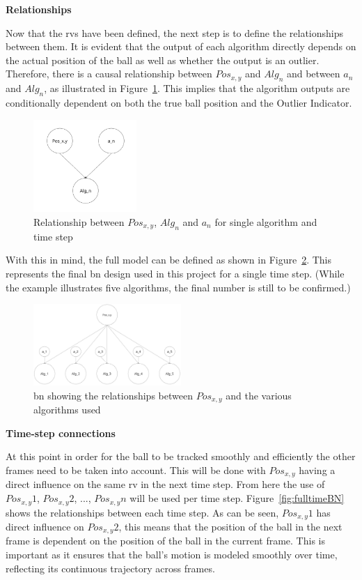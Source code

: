 \documentclass[12pt,a4paper]{article}
\begin{document}
\textbf{Relationships}

Now that the \acs{rv}s have been defined, the next step is to define the relationships between them. It is evident that the output of each algorithm directly depends on the actual position of the ball as well as whether the output is an outlier. Therefore, there is a causal relationship between $Pos_{x,y}$ and $Alg_n$ and between $a_n$ and $Alg_n$, as illustrated in Figure~\ref{fig:smallBN}. This implies that the algorithm outputs are conditionally dependent on both the true ball position and the Outlier Indicator.

\begin{figure}[H]
	\centering
	\includegraphics[width=0.35\textwidth]{smallBN.jpg}
	\caption{Relationship between $Pos_{x,y}$, $Alg_n$ and $a_n$ for single algorithm and time step}
	\label{fig:smallBN}
\end{figure}

With this in mind, the full model can be defined as shown in Figure~\ref{fig:fullBN}. This represents the final \acs{bn} design used in this project for a single time step. (While the example illustrates five algorithms, the final number is still to be confirmed.)

\begin{figure}[H]
	\centering
	\includegraphics[width=0.5\textwidth]{fullBN.jpg}
	\caption{\acl{bn} showing the relationships between $Pos_{x,y}$ and the various algorithms used}
	\label{fig:fullBN}
\end{figure}

\textbf{Time-step connections}

At this point in order for the ball to be tracked smoothly and efficiently the other frames need to be taken into account. This will be done with $Pos_{x,y}$ having a direct influence on the same \acs{rv} in the next time step. From here the use of $Pos_{x,y}1$, $Pos_{x,y}2$, ..., $Pos_{x,y}n$ will be used per time step. Figure~\ref{fig:fulltimeBN} shows the relationships between each time step. As can be seen, $Pos_{x,y}1$ has direct influence on $Pos_{x,y}2$, this means that the position of the ball in the next frame is dependent on the position of the ball in the current frame. This is important as it ensures that the ball's motion is modeled smoothly over time, reflecting its continuous trajectory across frames.
 
\end{document}

